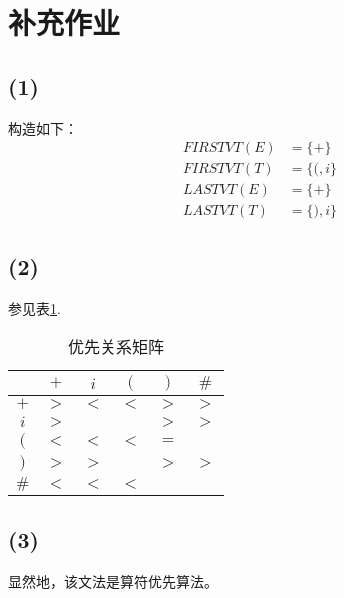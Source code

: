 \documentclass[UTF8]{ctexart}
\begin{document}
\section*{补充作业}
    \subsection*{(1)}
        构造如下：
        \begin{align*}
            FIRSTVT(E) &= \{+\} \\
            FIRSTVT(T) &= \{(, i\} \\
            LASTVT(E) &= \{+\} \\
            LASTVT(T) &= \{), i\} 
        \end{align*}

    \subsection*{(2)}
        参见表\ref{matrix}.
        \begin{table}
            \caption{优先关系矩阵}
            \centering
            \begin{tabular}{|c||c|c|c|c|c|}
                \hline
                & $+$ & $i$ & $($ & $)$ & $\#$ \\
                \hline \hline
                $+$ & $>$ & $<$ & $<$ & $>$ & $>$ \\
                \hline
                $i$ & $>$ &  &  & $>$ & $>$ \\
                \hline
                $($ & $<$ & $<$ & $<$ & $=$ &  \\
                \hline
                $)$ & $>$ & $>$ &  & $>$ & $>$ \\
                \hline
                $\#$ & $<$ & $<$ & $<$ &  &  \\
                \hline
            \end{tabular}
            \label{matrix}
        \end{table}

    \subsection*{(3)}
        显然地，该文法是算符优先算法。
\end{document}
